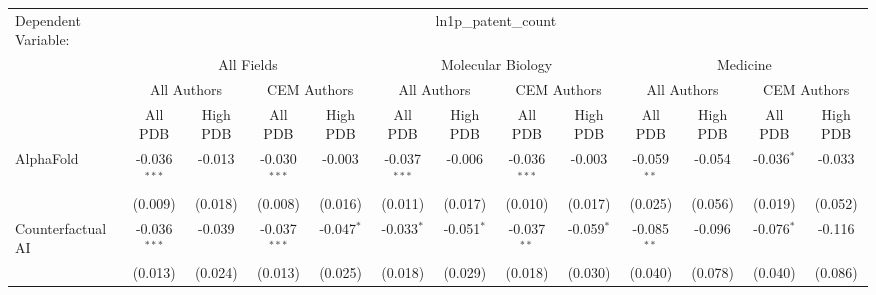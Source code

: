 \begingroup
\centering
\begin{tabular}{lcccccccccccc}
   \tabularnewline \midrule \midrule
   Dependent Variable: & \multicolumn{12}{c}{ln1p\_patent\_count}\\
 & \multicolumn{4}{c}{All Fields} & \multicolumn{4}{c}{Molecular Biology} & \multicolumn{4}{c}{Medicine} \\
\cmidrule(lr){2-5} \cmidrule(lr){6-9} \cmidrule(lr){10-13}
 & \multicolumn{2}{c}{All Authors} & \multicolumn{2}{c}{CEM Authors} & \multicolumn{2}{c}{All Authors} & \multicolumn{2}{c}{CEM Authors} & \multicolumn{2}{c}{All Authors} & \multicolumn{2}{c}{CEM Authors} \\
\cmidrule(lr){2-3} \cmidrule(lr){4-5} \cmidrule(lr){6-7} \cmidrule(lr){8-9} \cmidrule(lr){10-11} \cmidrule(lr){12-13}
 & \multicolumn{1}{c}{All PDB} & \multicolumn{1}{c}{High PDB} & \multicolumn{1}{c}{All PDB} & \multicolumn{1}{c}{High PDB} & \multicolumn{1}{c}{All PDB} & \multicolumn{1}{c}{High PDB} & \multicolumn{1}{c}{All PDB} & \multicolumn{1}{c}{High PDB} & \multicolumn{1}{c}{All PDB} & \multicolumn{1}{c}{High PDB} & \multicolumn{1}{c}{All PDB} & \multicolumn{1}{c}{High PDB} \\
\cmidrule(lr){2-2} \cmidrule(lr){3-3} \cmidrule(lr){4-4} \cmidrule(lr){5-5} \cmidrule(lr){6-6} \cmidrule(lr){7-7} \cmidrule(lr){8-8} \cmidrule(lr){9-9} \cmidrule(lr){10-10} \cmidrule(lr){11-11} \cmidrule(lr){12-12} \cmidrule(lr){13-13}
   AlphaFold                                                  & -0.036$^{***}$ & -0.013        & -0.030$^{***}$ & -0.003        & -0.037$^{***}$ & -0.006         & -0.036$^{***}$ & -0.003         & -0.059$^{**}$  & -0.054        & -0.036$^{*}$  & -0.033\\   
                                                              & (0.009)        & (0.018)       & (0.008)        & (0.016)       & (0.011)        & (0.017)        & (0.010)        & (0.017)        & (0.025)        & (0.056)       & (0.019)       & (0.052)\\   
   Counterfactual AI                                          & -0.036$^{***}$ & -0.039        & -0.037$^{***}$ & -0.047$^{*}$  & -0.033$^{*}$   & -0.051$^{*}$   & -0.037$^{**}$  & -0.059$^{*}$   & -0.085$^{**}$  & -0.096        & -0.076$^{*}$  & -0.116\\   
                                                              & (0.013)        & (0.024)       & (0.013)        & (0.025)       & (0.018)        & (0.029)        & (0.018)        & (0.030)        & (0.040)        & (0.078)       & (0.040)       & (0.086)\\   

\end{tabular}
